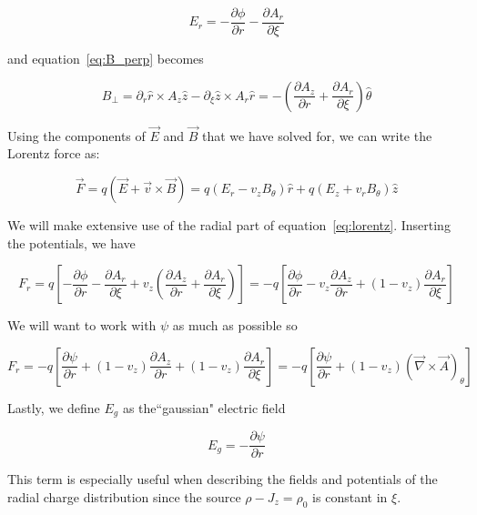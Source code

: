 \documentclass[aps,prl,preprint,groupedaddress]{revtex4-1}
\begin{document}
\begin{equation}\label{E_r}
E_r = -\frac{\partial \phi}{\partial r} - \frac{\partial A_r}{\partial \xi}
\end{equation}

and equation~\ref{eq:B_perp} becomes

\begin{equation}\label{B_theta}
B_\perp = \partial_r \hat{r} \times A_z \hat{z} - \partial_\xi \hat{z} \times A_r \hat{r} = -\left(\frac{\partial A_z}{\partial r} + \frac{\partial A_r}{\partial \xi}\right)\hat{\theta}
\end{equation}

Using the components of $\vec{E}$ and $\vec{B}$ that we have solved for, we can write the Lorentz force as:

\begin{equation}\label{eq:lorentz}
\vec{F} = q(\vec{E} + \vec{v} \times \vec{B}) = q(E_r - v_z B_\theta)\hat{r} + q(E_z + v_r B_\theta)\hat{z}
\end{equation}

We will make extensive use of the radial part of equation~\ref{eq:lorentz}. Inserting the potentials, we have

\begin{equation}\label{eq:F_r}
F_r = q\left[-\frac{\partial \phi}{\partial r} - \frac{\partial A_r}{\partial \xi} + v_z\left(\frac{\partial A_z}{\partial r} + \frac{\partial A_r}{\partial \xi}\right)\right] = -q\left[\frac{\partial \phi}{\partial r} - v_z \frac{\partial A_z}{\partial r} +(1-v_z) \frac{\partial A_r}{\partial \xi}\right]
\end{equation}

We will want to work with $\psi$ as much as possible so

\begin{equation}\label{eq:F_wPsi}
F_r = -q\left[\frac{\partial \psi}{\partial r} + (1-v_z)\frac{\partial A_z}{\partial r} + (1-v_z)\frac{\partial A_r}{\partial \xi}\right] = -q\left[\frac{\partial \psi}{\partial r} + (1-v_z)(\vec{\nabla} \times \vec{A})_\theta \right] 
\end{equation}

Lastly, we define $E_g$ as the``gaussian" electric field

\begin{equation}\label{eq:E_guass}
E_g = -\frac{\partial \psi}{\partial r}
\end{equation}

This term is especially useful when describing the fields and potentials of the radial charge distribution since the source $\rho - J_z = \rho_0$ is constant in $\xi$.
\end{document}
